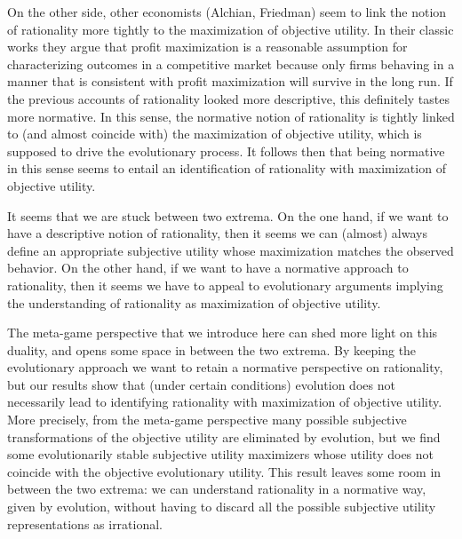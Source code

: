 \documentclass[fleqn,reqno,11pt]{article}
\begin{document}
On the other side, other economists (Alchian, Friedman) seem to link the notion of rationality
more tightly to the maximization of objective utility. In their classic works they argue that
profit maximization is a reasonable assumption for characterizing outcomes in a competitive
market because only firms behaving in a manner that is consistent with profit maximization will
survive in the long run. If the previous accounts of rationality looked more descriptive, this
definitely tastes more normative. In this sense, the normative notion of rationality is tightly
linked to (and almost coincide with) the maximization of objective utility, which is supposed
to drive the evolutionary process. It follows then that being normative in this sense seems to
entail an identification of rationality with maximization of objective utility.

It seems that we are stuck between two extrema. On the one hand, if we want to have a
descriptive notion of rationality, then it seems we can (almost) always define an appropriate
subjective utility whose maximization matches the observed behavior. On the other hand, if we
want to have a normative approach to rationality, then it seems we have to appeal to
evolutionary arguments implying the understanding of rationality as maximization of objective
utility.

The meta-game perspective that we introduce here can shed more light on this duality, and opens
some space in between the two extrema. By keeping the evolutionary approach we want to retain a
normative perspective on rationality, but our results show that (under certain conditions)
evolution does not necessarily lead to identifying rationality with maximization of objective
utility. More precisely, from the meta-game perspective many possible subjective
transformations of the objective utility are eliminated by evolution, but we find some
evolutionarily stable subjective utility maximizers whose utility does not coincide with the
objective evolutionary utility. This result leaves some room in between the two extrema: we can
understand rationality in a normative way, given by evolution, without having to discard all
the possible subjective utility representations as irrational.
\end{document}
